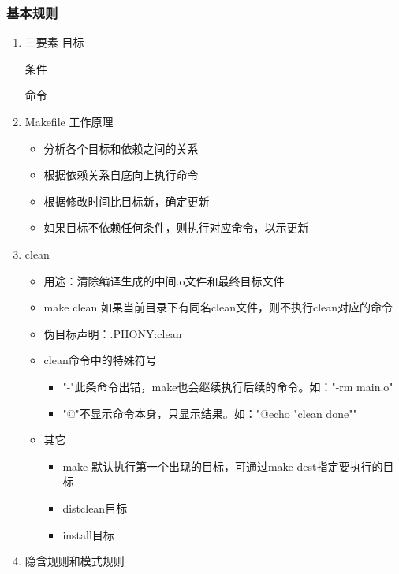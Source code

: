 \documentclass[11pt]{article}
\begin{document}
\subsubsection{基本规则}
\label{sec-1-6-2}
\begin{enumerate}
\item 三要素
\label{sec-1-6-2-1}
目标

条件

命令
\item Makefile 工作原理
\label{sec-1-6-2-2}
\begin{itemize}
\item 分析各个目标和依赖之间的关系
\item 根据依赖关系自底向上执行命令
\item 根据修改时间比目标新，确定更新
\item 如果目标不依赖任何条件，则执行对应命令，以示更新
\end{itemize}
\item clean
\label{sec-1-6-2-3}
\begin{itemize}
\item 用途：清除编译生成的中间.o文件和最终目标文件
\item make clean 如果当前目录下有同名clean文件，则不执行clean对应的命令
\item 伪目标声明：.PHONY:clean
\item clean命令中的特殊符号
\begin{itemize}
\item "-"此条命令出错，make也会继续执行后续的命令。如："-rm main.o"
\item "@"不显示命令本身，只显示结果。如："@echo "clean done""
\end{itemize}
\item 其它
\begin{itemize}
\item make 默认执行第一个出现的目标，可通过make dest指定要执行的目标
\item distclean目标
\item install目标
\end{itemize}
\end{itemize}
\item 隐含规则和模式规则
\label{sec-1-6-2-4}
\end{enumerate}
\end{document}
